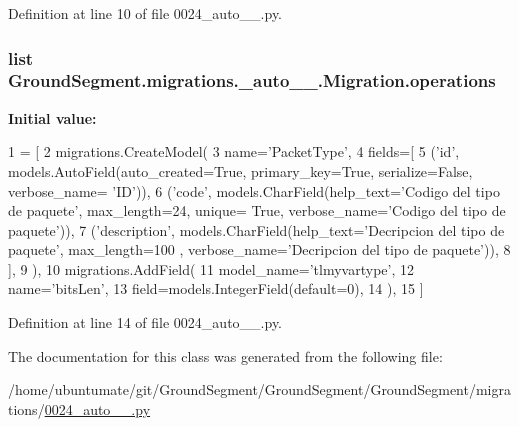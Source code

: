 Definition at line 10 of file 0024\+\_\+auto\+\_\+\_.\+py.

\hypertarget{class_ground_segment_1_1migrations_1_10024__auto__20161204__1335_1_1_migration_a1303507a1f53404d856b7e8d81629c8d}{}
\subsubsection[{operations}]{\setlength{\rightskip}{0pt plus 5cm}list Ground\+Segment.\+migrations.\+\_\+auto\+\_\+\_.\+Migration.\+operations\hspace{0.3cm}{\ttfamily [static]}}\label{class_ground_segment_1_1migrations_1_10024__auto__20161204__1335_1_1_migration_a1303507a1f53404d856b7e8d81629c8d}
{\bfseries Initial value\+:}
\begin{DoxyCode}
1 = [
2         migrations.CreateModel(
3             name=\textcolor{stringliteral}{'PacketType'},
4             fields=[
5                 (\textcolor{stringliteral}{'id'}, models.AutoField(auto\_created=\textcolor{keyword}{True}, primary\_key=\textcolor{keyword}{True}, serialize=\textcolor{keyword}{False}, verbose\_name=\textcolor{stringliteral}{
      'ID'})),
6                 (\textcolor{stringliteral}{'code'}, models.CharField(help\_text=\textcolor{stringliteral}{'Codigo del tipo de paquete'}, max\_length=24, unique=\textcolor{keyword}{
      True}, verbose\_name=\textcolor{stringliteral}{'Codigo del tipo de paquete'})),
7                 (\textcolor{stringliteral}{'description'}, models.CharField(help\_text=\textcolor{stringliteral}{'Decripcion del tipo de paquete'}, max\_length=100
      , verbose\_name=\textcolor{stringliteral}{'Decripcion del tipo de paquete'})),
8             ],
9         ),
10         migrations.AddField(
11             model\_name=\textcolor{stringliteral}{'tlmyvartype'},
12             name=\textcolor{stringliteral}{'bitsLen'},
13             field=models.IntegerField(default=0),
14         ),
15     ]
\end{DoxyCode}


Definition at line 14 of file 0024\+\_\+auto\+\_\+\_.\+py.



The documentation for this class was generated from the following file\+:\begin{DoxyCompactItemize}
\item 
/home/ubuntumate/git/\+Ground\+Segment/\+Ground\+Segment/\+Ground\+Segment/migrations/\hyperlink{0024__auto__20161204__1335_8py}{0024\+\_\+auto\+\_\+\_.\+py}\end{DoxyCompactItemize}
